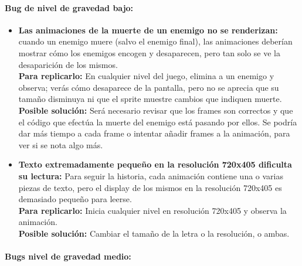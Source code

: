 \documentclass[12pt,a4paper,twoside,spanish]{article}      %
\begin{document}
\paragraph*{Bug de nivel de gravedad bajo:}

\begin{itemize}
    \item \textbf{Las animaciones de la muerte de un enemigo no se renderizan:} cuando un enemigo muere (salvo el enemigo final), las animaciones deberían mostrar cómo los enemigos encogen y desaparecen, pero tan solo se ve la desaparición de los mismos.\\[1mm]
    \textbf{Para replicarlo:} En cualquier nivel del juego, elimina a un enemigo y observa; verás cómo desaparece de la pantalla, pero no se aprecia que su tamaño disminuya ni que el sprite muestre cambios que indiquen muerte.\\[1mm]
    \textbf{Posible solución:} Será necesario revisar que los frames son correctos y que el código que efectúa la muerte del enemigo está pasando por ellos. Se podría dar más tiempo a cada frame o intentar añadir frames a la animación, para ver si se nota algo más.
    
    \item \textbf{Texto extremadamente pequeño en la resolución 720x405 dificulta su lectura:} Para seguir la historia, cada animación contiene una o varias piezas de texto, pero el display de los mismos en la resolución 720x405 es demasiado pequeño para leerse.\\[1mm]
    \textbf{Para replicarlo:} Inicia cualquier nivel en resolución 720x405 y observa la animación.\\[1mm]
    \textbf{Posible solución:} Cambiar el tamaño de la letra o la resolución, o ambas.
\end{itemize}

\bigskip

\paragraph*{Bugs nivel de gravedad medio:}
\end{document}
